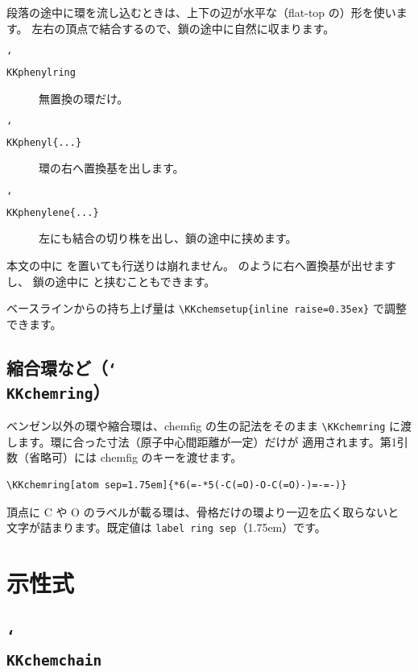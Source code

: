 \documentclass[paper=a4paper,fontsize=10pt]{jlreq}
\begin{document}
段落の途中に環を流し込むときは、上下の辺が水平な（flat-top の）形を使います。
左右の頂点で結合するので、鎖の途中に自然に収まります。

\begin{description}
\item[\texttt{\char`\\KKphenylring}] 無置換の環だけ。
\item[\texttt{\char`\\KKphenyl\{...\}}] 環の右へ置換基を出します。
\item[\texttt{\char`\\KKphenylene\{...\}}] 左にも結合の切り株を出し、鎖の途中に挟めます。
\end{description}

本文の中に \KKphenylring{} を置いても行送りは崩れません。
 のように右へ置換基が出せますし、
鎖の途中に  と挟むこともできます。

ベースラインからの持ち上げ量は \verb|\KKchemsetup{inline raise=0.35ex}| で調整できます。

\subsection{縮合環など（\texttt{\char`\\KKchemring}）}

ベンゼン以外の環や縮合環は、\textsf{chemfig} の生の記法をそのまま
\verb|\KKchemring| に渡します。環に合った寸法（原子中心間距離が一定）だけが
適用されます。第1引数（省略可）には \textsf{chemfig} のキーを渡せます。

\begin{verbatim}
\KKchemring[atom sep=1.75em]{*6(=-*5(-C(=O)-O-C(=O)-)=-=-)}
\end{verbatim}

\begin{center}
\KKphthalicanhydride\qquad\KKmaleicanhydride
\end{center}

頂点に C や O のラベルが載る環は、骨格だけの環より一辺を広く取らないと
文字が詰まります。既定値は \verb|label ring sep|（1.75em）です。

\section{示性式}

\subsection{\texttt{\char`\\KKchemchain}}
\end{document}
